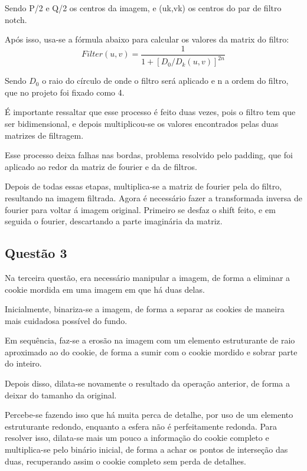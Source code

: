 \documentclass[conference]{IEEEtran}
\begin{document}
Sendo P/2 e Q/2 os centros da imagem, e (uk,vk) os centros do par de filtro notch.

Após isso, usa-se a fórmula abaixo para calcular os valores da matrix do filtro:
\begin{equation}
    \label{eq6}
    Filter(u,v) = \frac{1}{1+[D_{0}/D_{k}(u,v)]^{2n}}
\end{equation}

Sendo $D_{0}$ o raio do círculo de onde o filtro será aplicado e n a ordem do filtro, que no projeto
foi fixado como 4.

É importante ressaltar que esse processo é feito duas vezes, pois o filtro tem que ser bidimensional,
e depois multiplicou-se os valores encontrados pelas duas matrizes de filtragem.

Esse processo deixa falhas nas bordas, problema resolvido pelo padding, que foi aplicado
ao redor da matriz de fourier e da de filtros.

Depois de todas essas etapas, multiplica-se a matriz de fourier pela do filtro, resultando na imagem
filtrada. Agora é necessário fazer a transformada inversa de fourier para voltar á imagem original.
Primeiro se desfaz o shift feito, e em seguida o fourier, descartando a parte imaginária da matriz.

\subsection{Questão 3}

Na terceira questão, era necessário manipular a imagem, de forma a eliminar a cookie mordida
em uma imagem em que há duas delas.

Inicialmente, binariza-se a imagem, de forma a separar as cookies de maneira mais cuidadosa possível do fundo.

Em sequência, faz-se a erosão na imagem com um elemento estruturante de raio aproximado
ao do cookie, de forma a sumir com o cookie mordido e sobrar parte do inteiro.

Depois disso, dilata-se novamente o resultado da operação anterior, de forma a deixar do tamanho da original.

Percebe-se fazendo isso que há muita perca de detalhe, por uso de um elemento estruturante redondo, enquanto a esfera não é perfeitamente redonda.
Para resolver isso, dilata-se mais um pouco a informação do cookie completo e multiplica-se pelo binário inicial, de forma
a achar os pontos de interseção das duas, recuperando assim o cookie completo sem perda de detalhes.
\end{document}
